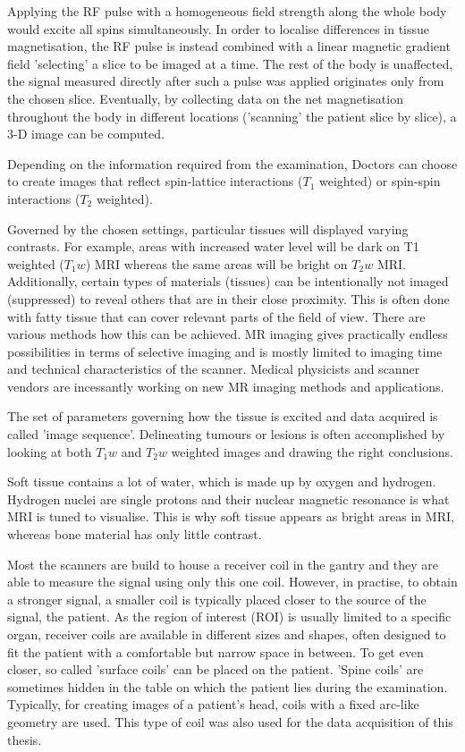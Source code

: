 Applying the RF pulse with a homogeneous field strength along the whole body would excite all spins simultaneously.
In order to localise differences in tissue magnetisation, the RF pulse is instead combined with a linear magnetic gradient field 'selecting' a slice to be imaged at a time.
The rest of the body is unaffected, the signal measured directly after such a pulse was applied originates only from the chosen slice.
Eventually, by collecting data on the net magnetisation throughout the body in different locations ('scanning' the patient slice by slice), a 3-D image can be computed.

Depending on the information required from the examination, Doctors can choose to create images that reflect spin-lattice interactions ($T_1$ weighted) or spin-spin interactions ($T_2$ weighted).

Governed by the chosen settings, particular tissues will displayed varying contrasts.
For example, areas with increased water level will be dark on T1 weighted ($T_1w$) MRI whereas the same areas will be bright on $T_2w$ MRI.
Additionally, certain types of materials (tissues) can be intentionally not imaged (suppressed) to reveal others that are in their close proximity.
This is often done with fatty tissue that can cover relevant parts of the field of view.
There are various methods how this can be achieved.
MR imaging gives practically endless possibilities in terms of selective imaging and is mostly limited to imaging time and technical characteristics of the scanner.
Medical physicists and scanner vendors are incessantly working on new MR imaging methods and applications. 

The set of parameters governing how the tissue is excited and data acquired is called 'image sequence'.
Delineating tumours or lesions is often accomplished by looking at both $T_1w$ and $T_2w$ weighted images and drawing the right conclusions.

Soft tissue contains a lot of water, which is made up by oxygen and hydrogen.
Hydrogen nuclei are single protons and their nuclear magnetic resonance is what MRI is tuned to visualise.
This is why soft tissue appears as bright areas in MRI, whereas bone material has only little contrast. \cite{Currie2013}


Most the scanners are build to house a receiver coil in the gantry and they are able to measure the signal using only this one coil.
However, in practise, to obtain a stronger signal, a smaller coil is typically placed closer to the source of the signal, the patient.
As the region of interest (ROI) is usually limited to a specific organ, receiver coils are available in different sizes and shapes, often designed to fit the patient with a comfortable but narrow space in between.
To get even closer, so called 'surface coils' can be placed on the patient.
'Spine coils' are sometimes hidden in the table on which the patient lies during the examination.
Typically, for creating images of a patient's head, coils with a fixed arc-like geometry are used.
This type of coil was also used for the data acquisition of this thesis.

